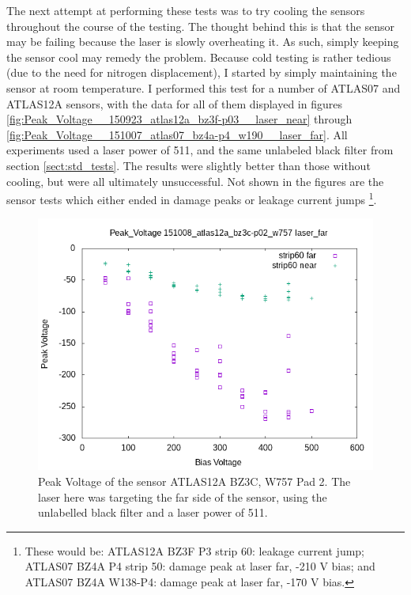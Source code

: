 \documentclass{report}
\begin{document}
            The next attempt at performing these tests was to try cooling the sensors throughout the course of the testing. The thought behind this is that the sensor may be failing because the laser is slowly overheating it. As such, simply keeping the sensor cool may remedy the problem. Because cold testing is rather tedious (due to the need for nitrogen displacement), I started by simply maintaining the sensor at room temperature. I performed this test for a number of ATLAS07 and ATLAS12A sensors, with the data for all of them displayed in figures \ref{fig:Peak_Voltage__150923_atlas12a_bz3f-p03__laser_near} through \ref{fig:Peak_Voltage__151007_atlas07_bz4a-p4_w190__laser_far}. All experiments used a laser power of 511, and the same unlabeled black filter from section \ref{sect:std_tests}. The results were slightly better than those without cooling, but were all ultimately unsuccessful. Not shown in the figures are the sensor tests which either ended in damage peaks or leakage current jumps \footnote{These would be: ATLAS12A BZ3F P3 strip 60: leakage current jump; ATLAS07 BZ4A P4 strip 50: damage peak at laser far, -210 V bias; and ATLAS07 BZ4A W138-P4: damage peak at laser far, -170 V bias.}.

            \begin{figure}[h] 
                \includegraphics[height=.4\textheight]{Peak_Voltage__151008_atlas12a_bz3c-p02_w757__laser_far}
                \centering
                \caption{ Peak Voltage of the sensor ATLAS12A BZ3C, W757 Pad 2. The laser here was targeting the far side of the sensor, using the unlabelled black filter and a laser power of 511. }
                \label{fig:Peak_Voltage__151008_atlas12a_bz3c-p02_w757__laser_far}
            \end{figure}
\end{document}
